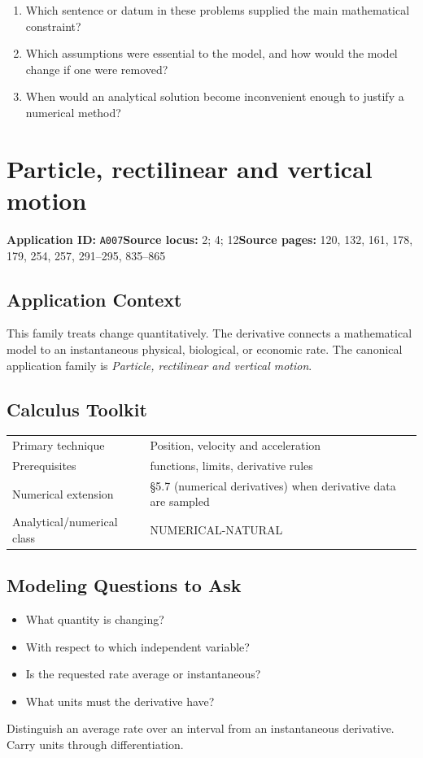 \documentclass[11pt]{book}
\newcommand{\pid}[1]{\texttt{#1}}
\begin{document}
\begin{reflectionbox}\begin{enumerate}
\item Which sentence or datum in these problems supplied the main mathematical constraint?
\item Which assumptions were essential to the model, and how would the model change if one were removed?
\item When would an analytical solution become inconvenient enough to justify a numerical method?
\end{enumerate}\end{reflectionbox}
\chapter{Particle, rectilinear and vertical motion}\label{app:A007}
\textbf{Application ID:} \pid{A007}\quad \textbf{Source locus:} 2; 4; 12\quad \textbf{Source pages:} 120, 132, 161, 178, 179, 254, 257, 291–295, 835–865
\section*{Application Context}
This family treats change quantitatively. The derivative connects a mathematical model to an instantaneous physical, biological, or economic rate. The canonical application family is \emph{Particle, rectilinear and vertical motion}.
\section*{Calculus Toolkit}
\begin{tabularx}{\textwidth}{@{}lX@{}}\toprule
Primary technique & Position, velocity and acceleration \\
Prerequisites & functions, limits, derivative rules \\
Numerical extension & §5.7 (numerical derivatives) when derivative data are sampled \\
Analytical/numerical class & NUMERICAL-NATURAL \\
\bottomrule\end{tabularx}
\section*{Modeling Questions to Ask}\begin{itemize}
\item What quantity is changing?
\item With respect to which independent variable?
\item Is the requested rate average or instantaneous?
\item What units must the derivative have?
\end{itemize}
\begin{errorbox}Distinguish an average rate over an interval from an instantaneous derivative. Carry units through differentiation.\end{errorbox}
\end{document}
